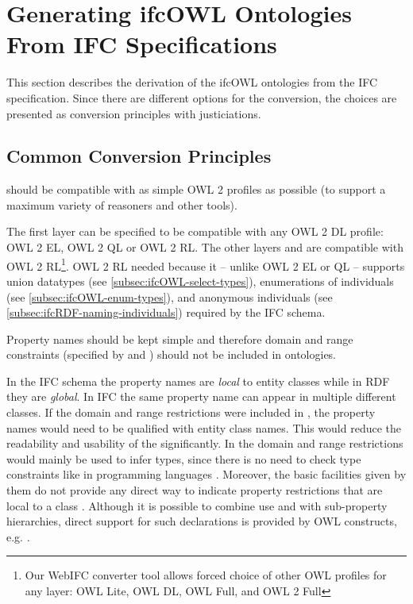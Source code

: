 
\section{Generating ifcOWL Ontologies From IFC Specifications}
\label{sec:ifcOWL}
This section describes the derivation of the ifcOWL ontologies from the IFC specification. Since there are different options for the conversion, the choices are presented as conversion principles with justiciations. 

\subsection{Common Conversion Principles}

\begin{principle}
\ifcowl{} should be compatible with as simple OWL 2 profiles as possible (to support a maximum variety of reasoners and other tools). 
\end{principle}

The first layer \ifcsimple{} can be specified to be compatible with any OWL 2 DL profile: OWL 2 EL, OWL 2 QL or OWL 2 RL. The other layers \ifcstandard{} and \ifcextended{} are compatible with OWL 2 RL\footnote{Our WebIFC converter tool allows forced choice of other OWL profiles for any layer: OWL Lite, OWL DL, OWL Full, and OWL 2 Full}. OWL 2 RL needed because it -- unlike OWL 2 EL or QL -- supports 
union data\-types (see \ref{subsec:ifcOWL-select-types}), enumerations of individuals (see \ref{subsec:ifcOWL-enum-types}), and anonymous individuals (see \ref{subsec:ifcRDF-naming-individuals}) required by the IFC schema. \cite{w3c:owl2-profiles}

\begin{principle}
Property names should be kept simple and therefore domain and range constraints (specified by  and ) should not be included in \ifcowl{} ontologies.
\end{principle}

In the IFC schema the property names are \emph{local} to entity classes while in RDF they are \emph{global}. 
In IFC the same property name can appear in multiple different classes. If the domain and range restrictions
were included in  \ifcowl{}, the property names would need to be qualified with entity class names. This 
would reduce the readability and usability of the \ifcowl{} significantly. In \ifcowl{} the domain and 
range restrictions would mainly be used to infer types, since there is no need to check type constraints 
like in programming languages \cite{w3c:owl-guide}. Moreover, the basic facilities given by them do not 
provide any direct way to indicate property restrictions that are local to a class \cite{w3c:rdf-schema}. 
Although it is possible to combine use  and  with sub-property hierarchies, 
direct support for such declarations is provided by OWL constructs, e.g. .

